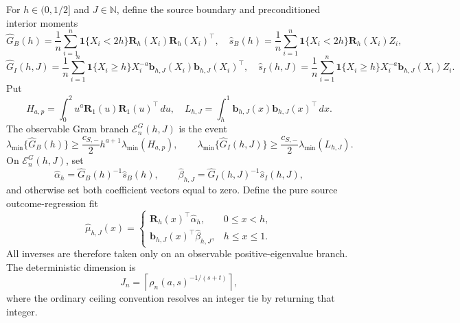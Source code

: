 For \(h\in(0,1/2]\) and \(J\in\mathbb N\), define the source boundary and preconditioned interior moments
\[
\widehat G_B(h)=\frac1n\sum_{i=1}^n\mathbf 1\{X_i<2h\}\mathbf R_h(X_i)\mathbf R_h(X_i)^\top,
\quad
\widehat s_B(h)=\frac1n\sum_{i=1}^n\mathbf 1\{X_i<2h\}\mathbf R_h(X_i)Z_i,
\]
\[
\widehat G_I(h,J)=\frac1n\sum_{i=1}^n\mathbf 1\{X_i\ge h\}X_i^{-a}\mathbf b_{h,J}(X_i)\mathbf b_{h,J}(X_i)^\top,
\quad
\widehat s_I(h,J)=\frac1n\sum_{i=1}^n\mathbf 1\{X_i\ge h\}X_i^{-a}\mathbf b_{h,J}(X_i)Z_i.
\]
Put
\[
H_{a,p}=\int_0^2u^a\mathbf R_1(u)\mathbf R_1(u)^\top\,du,
\quad
L_{h,J}=\int_h^1\mathbf b_{h,J}(x)\mathbf b_{h,J}(x)^\top\,dx.
\]
The observable Gram branch \(\mathcal E^G_{n}(h,J)\) is the event
\[
\lambda_{\min}\{\widehat G_B(h)\}\ge\frac{c_{S,-}}2h^{a+1}\lambda_{\min}(H_{a,p}),
\qquad
\lambda_{\min}\{\widehat G_I(h,J)\}\ge\frac{c_{S,-}}2\lambda_{\min}(L_{h,J}).
\]
On \(\mathcal E^G_n(h,J)\), set
\[
\widehat\alpha_h=\widehat G_B(h)^{-1}\widehat s_B(h),
\qquad
\widehat\beta_{h,J}=\widehat G_I(h,J)^{-1}\widehat s_I(h,J),
\]
and otherwise set both coefficient vectors equal to zero.  Define the pure source outcome-regression fit
\[
\widehat\mu_{h,J}(x)=
\begin{cases}
\mathbf R_h(x)^\top\widehat\alpha_h,&0\le x<h,\\
\mathbf b_{h,J}(x)^\top\widehat\beta_{h,J},&h\le x\le1.
\end{cases}
\]
All inverses are therefore taken only on an observable positive-eigenvalue branch.  The deterministic dimension is
\[
J_n=\left\lceil\rho_n(a,s)^{-1/(s+t)}\right\rceil,
\]
where the ordinary ceiling convention resolves an integer tie by returning that integer.